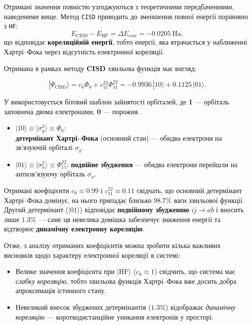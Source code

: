 Отримані значення повністю узгоджуються з теоретичними передбаченнями, наведеними вище.
Метод \texttt{CISD} приводить до зменшення повної енергії порівняно з \texttt{HF}:
\[
E_{\text{CISD}} - E_{\text{HF}} = \Delta E_{\text{corr}} = -0.0205~\text{Ha},
\]
що відповідає \textbf{кореляційній енергії}, тобто енергії, яка втрачається у наближенні Хартрі–Фока через відсутність електронної кореляції.

Отримана в рамках методу \textbf{CISD} хвильова функція має вигляд:

\begin{equation*}
|\Psi_{\text{CISD}}\rangle = c_0 \Phi_0 + c_{11}^{22} \Phi_{11}^{22} =
-0.9936\,|10\rangle + 0.1125\,|01\rangle.
\end{equation*}


\begin{commentbox}
У \PySCF{} використовується бітовий шаблон зайнятості орбіталей, де \textbf{1} --- орбіталь заповнена двома електронами, \textbf{0} --- порожня.
\begin{itemize}
    \item \( |10\rangle \equiv |\sigma_g^2\rangle \equiv \Phi_0 \):\\
          \textbf{детермінант Хартрі--Фока} (основний стан) --- обидва електрони на зв’язуючій орбіталі \(\sigma_g\).
    \item \( |01\rangle \equiv |\sigma_u^2\rangle \equiv \Phi_{11}^{22} \):
          \textbf{подвійне збудження} --- обидва електрони перейшли на антизв’язуючу орбіталь \(\sigma_u\).
\end{itemize}
\end{commentbox}

Отримані коефіцієнти
\(c_0 \approx 0.99\) і \(c_{11}^{22} \approx 0.11\)
свідчать, що основний детермінант  Хартрі–Фока домінує, на нього припадає близько $98.7\%$ ваги хвильової функції.
Другий детермінант ($|01\rangle$) відповідає \textbf{подвійному збудженню} $ij\!\to\!ab$ і вносить лише $1.3\%$ --- саме ця невелика домішка забезпечує зниження енергії та відтворює \textbf{динамічну електронну кореляцію}.

Отже, з аналізу отриманих коефіцієнтів можна зробити кілька важливих висновків щодо характеру електронної кореляції в системі:
\begin{itemize}
    \item Велике значення коефіцієнта при $|\mathrm{HF}\rangle$ (\(c_0 \approx 1\)) свідчить, що система має \emph{слабку кореляцію}, тобто хвильова функція Хартрі–Фока вже досить добра апроксимація істинного стану.
    \item Невеликий внесок збуджених детермінантів (\(1.3\%\)) відображає \emph{динамічну кореляцію} --- короткодистанційне уникання електронів у просторі.
\end{itemize}


